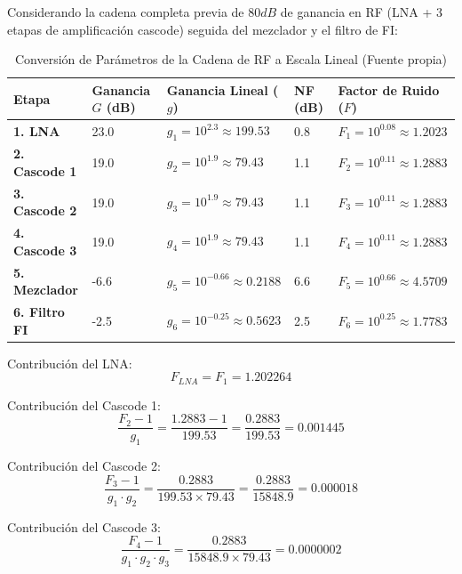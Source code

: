\documentclass[11pt,a4paper,twoside]{report}
\begin{document}
	Considerando la cadena completa previa de $80dB$ de ganancia en RF (LNA + 3 etapas de amplificación cascode) seguida del mezclador y el filtro de FI:
	\begin{table}[h!]
		\centering
		\begin{tabular}{|l|l|l|l|l|}
			\hline
			\textbf{Etapa} & \textbf{Ganancia $G$ (dB)} & \textbf{Ganancia Lineal ($g$)} & \textbf{NF (dB)} & \textbf{Factor de Ruido ($F$)} \\ \hline
			\textbf{1. LNA} & 23.0 & $g_1 = 10^{2.3} \approx 199.53$ & 0.8 & $F_1 = 10^{0.08} \approx 1.2023$ \\ \hline
			\textbf{2. Cascode 1} & 19.0 & $g_2 = 10^{1.9} \approx 79.43$ & 1.1 & $F_2 = 10^{0.11} \approx 1.2883$ \\ \hline
			\textbf{3. Cascode 2} & 19.0 & $g_3 = 10^{1.9} \approx 79.43$ & 1.1 & $F_3 = 10^{0.11} \approx 1.2883$ \\ \hline
			\textbf{4. Cascode 3} & 19.0 & $g_4 = 10^{1.9} \approx 79.43$ & 1.1 & $F_4 = 10^{0.11} \approx 1.2883$ \\ \hline
			\textbf{5. Mezclador} & -6.6 & $g_5 = 10^{-0.66} \approx 0.2188$ & 6.6 & $F_5 = 10^{0.66} \approx 4.5709$ \\ \hline
			\textbf{6. Filtro FI} & -2.5 & $g_6 = 10^{-0.25} \approx 0.5623$ & 2.5 & $F_6 = 10^{0.25} \approx 1.7783$ \\ \hline
		\end{tabular}
			\caption{Conversión de Parámetros de la Cadena de RF a Escala Lineal (Fuente propia)}
	\end{table}
	
	Contribución del LNA:
	\begin{equation}
		F_{LNA} = F_1 = \mathbf{1.202264}
	\end{equation}
	
	Contribución del Cascode 1:
	\begin{equation}
		\frac{F_2 - 1}{g_1} = \frac{1.2883 - 1}{199.53} = \frac{0.2883}{199.53} = \mathbf{0.001445}
	\end{equation}
	
	Contribución del Cascode 2:
	\begin{equation}
		\frac{F_3 - 1}{g_1 \cdot g_2} = \frac{0.2883}{199.53 \times 79.43} = \frac{0.2883}{15848.9} = \mathbf{0.000018}
	\end{equation}
	
	Contribución del Cascode 3:
	\begin{equation}
		\frac{F_4 - 1}{g_1 \cdot g_2 \cdot g_3} = \frac{0.2883}{15848.9 \times 79.43} = \mathbf{0.0000002}
	\end{equation}
	
\end{document}
